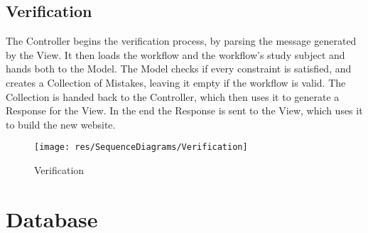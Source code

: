 \documentclass[11pt,a4paper]{report}
\begin{document}
{{{{{{{{{{{{{		\clearpage
		
		\section{Verification}{
			The Controller begins the verification process, by parsing the message generated by the View. It then loads the workflow and the workflow's study subject and hands both to the Model. The Model checks if every constraint is satisfied, and creates a Collection of Mistakes, leaving it empty if the workflow is valid. The Collection is handed back to the Controller, which then uses it to generate a Response for the View. In the end the Response is sent to the View, which uses it to build the new website.
			
			\begin{figure}[ht]
				\centering
				\texttt{[image: res/SequenceDiagrams/Verification]}
				\caption{Verification}
			\end{figure}
		}	
	}

	\chapter{Database}{
}}}}}}}}}}}}}
\end{document}
